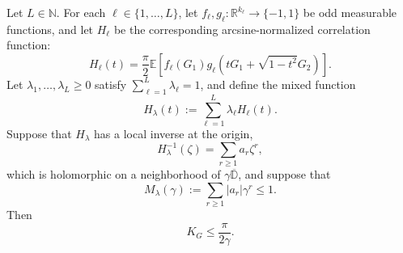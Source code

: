 \begin{theorem}
\label{thm:appendix-mixed-krivine-rounding}
Let \(L\in\mathbb N\). For each \(\ell\in\{1,\ldots,L\}\), let
\(f_\ell,g_\ell:\mathbb R^{k_\ell}\to\{-1,1\}\) be odd measurable functions,
and let \(H_\ell\) be the corresponding arcsine-normalized correlation
function:
\[
    H_\ell(t)
    =
    \frac{\pi}{2}
    \mathbb E\left[
        f_\ell\left(G_1\right)
        g_\ell\left(tG_1+\sqrt{1-t^2}G_2\right)
    \right].
\]
Let \(\lambda_1,\ldots,\lambda_L\ge 0\) satisfy
\(\sum_{\ell=1}^L\lambda_\ell=1\), and define the mixed function
\[
    H_\lambda(t):=\sum_{\ell=1}^L\lambda_\ell H_\ell(t).
\]
Suppose that \(H_\lambda\) has a local inverse at the origin,
\[
    H_\lambda^{-1}(\zeta)=\sum_{r\ge 1} a_r\zeta^r,
\]
which is holomorphic on a neighborhood of \(\gamma\overline{\mathbb D}\),
and suppose that
\[
    M_\lambda(\gamma)
    :=
    \sum_{r\ge 1}|a_r|\gamma^r
    \le 1.
\]
Then
\[
    K_G\le \frac{\pi}{2\gamma}.
\]
\end{theorem}


